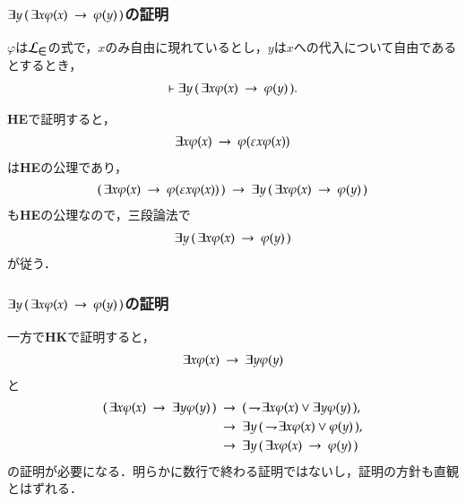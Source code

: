 \documentclass[dvipdfmx,10pt,notheorems]{beamer}
\theoremstyle{definition}
\newcommand{\lang}[1]{\mathcal{L}_{\scalebox{1.2}{$#1$}}} %
\newcommand{\negation}{\rightharpoondown\hspace{-0.25em}} %
\newcommand{\rarrow}{\hspace{0.25em}\rightarrow\hspace{0.25em}} %
\begin{document}
\begin{frame}\frametitle{$\exists y\, (\, \exists x \varphi(x) \rarrow \varphi(y)\, )$の証明}
	\begin{block}{}
		$\varphi$は$\lang{\in}$の式で，$x$のみ自由に現れているとし，$y$は$x$への代入について自由であるとするとき，
		\begin{align}
			\vdash \exists y\, (\, \exists x \varphi(x) \rarrow \varphi(y)\, ).
		\end{align}
	\end{block}
	{\bf HE}で証明すると，
	\begin{align}
		\exists x \varphi(x) \rarrow \varphi(\varepsilon x \varphi(x))
	\end{align}
	は{\bf HE}の公理であり，
	\begin{align}
		(\, \exists x \varphi(x) \rarrow \varphi(\varepsilon x \varphi(x))\, ) 
		\rarrow \exists y\, (\, \exists x \varphi(x) \rarrow \varphi(y)\, )
	\end{align}
	も{\bf HE}の公理なので，三段論法で
	\begin{align}
		\exists y\, (\, \exists x \varphi(x) \rarrow \varphi(y)\, )
	\end{align}
	が従う．
\end{frame}

\begin{frame}\frametitle{$\exists y\, (\, \exists x \varphi(x) \rarrow \varphi(y)\, )$の証明}
	一方で{\bf HK}で証明すると，
	\begin{align}
		\exists x \varphi(x) \rarrow \exists y \varphi(y)
	\end{align}
	と
	\begin{align}
		(\, \exists x \varphi(x) \rarrow \exists y \varphi(y) \, )
		&\rarrow (\, \negation \exists x \varphi(x) \vee \exists y \varphi(y) \, ), \\
		&\rarrow \exists y\, (\, \negation \exists x \varphi(x) \vee \varphi(y) \, ), \\
		&\rarrow \exists y\, (\, \exists x \varphi(x) \rarrow \varphi(y) \, )
	\end{align}
	の証明が必要になる．明らかに数行で終わる証明ではないし，証明の方針も直観とはずれる．
\end{frame}
\end{document}
